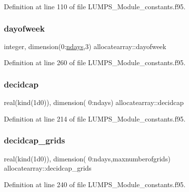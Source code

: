 Definition at line 110 of file L\+U\+M\+P\+S\+\_\+\+Module\+\_\+constants.\+f95.

\mbox{\label{namespaceallocatearray_a7bc9ecd33459d391cf70ea0bb83dce0f}} 
\subsubsection{\texorpdfstring{dayofweek}{dayofweek}}
{\footnotesize\ttfamily integer, dimension(0\+:\hyperlink{namespaceallocatearray_ad1f75258d3afd41ea7c941d35561665b}{ndays},3) allocatearray\+::dayofweek}



Definition at line 260 of file L\+U\+M\+P\+S\+\_\+\+Module\+\_\+constants.\+f95.

\mbox{\label{namespaceallocatearray_a73c64b6d041d6c9bb27a54bd87fcb9b9}} 
\subsubsection{\texorpdfstring{decidcap}{decidcap}}
{\footnotesize\ttfamily real(kind(1d0)), dimension( 0\+:ndays) allocatearray\+::decidcap}



Definition at line 214 of file L\+U\+M\+P\+S\+\_\+\+Module\+\_\+constants.\+f95.

\mbox{\label{namespaceallocatearray_a346cb07a7ef17556940b2325e8d43cf5}} 
\subsubsection{\texorpdfstring{decidcap\+\_\+grids}{decidcap\_grids}}
{\footnotesize\ttfamily real(kind(1d0)), dimension( 0\+:ndays,maxnumberofgrids) allocatearray\+::decidcap\+\_\+grids}



Definition at line 240 of file L\+U\+M\+P\+S\+\_\+\+Module\+\_\+constants.\+f95.

\mbox{\label{namespaceallocatearray_a7d7cb2bf89442acf85652779a9f82c2d}} 
